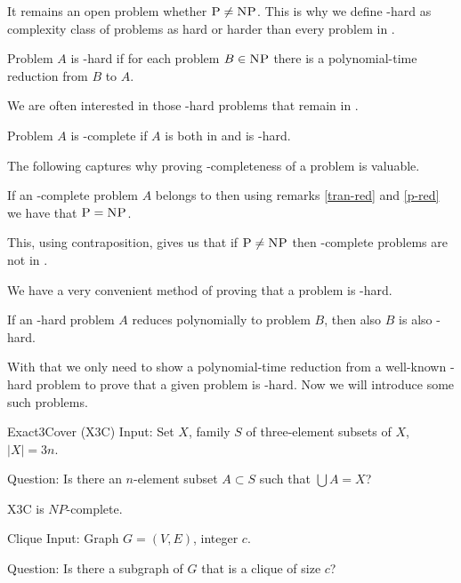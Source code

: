 It remains an open problem whether $\text{\textsc{P}}\neq\text{\textsc{NP}}$.
This is why we define \np-hard as complexity class of problems as hard or harder than every problem in \np.

\begin{defn}[\np-hard]
Problem $A$ is \np-hard if for each problem $B \in \text{\textsc{NP}}$
there is a polynomial-time reduction from $B$ to $A$.
\end{defn}

We are often interested in those \np-hard problems that remain in \np.

\begin{defn}[\np-complete]
Problem $A$ is \np-complete if $A$ is both in \np and is \np-hard.
\end{defn}

The following captures why proving \np-completeness of a problem is valuable.

\begin{rmrk}
If an \np-complete problem $A$ belongs to \p then using remarks \ref{tran-red} and \ref{p-red}
we have that $\text{\textsc{P}} = \text{\textsc{NP}}$.
\end{rmrk}

This, using contraposition, gives us that if $\text{\textsc{P}} \neq \text{\textsc{NP}}$ then \np-complete problems are not in \p.

We have a very convenient method of proving that a problem is \np-hard.

\begin{rmrk}
If an \np-hard problem $A$ reduces polynomially to problem $B$, then also $B$ is also \np-hard.
\end{rmrk}

With that we only need to show a polynomial-time reduction from a well-known \np-hard problem
to prove that a given problem is \np-hard.
Now we will introduce some such problems.

\begin{problem}{Exact3Cover (X3C)}
	Input: Set $X$, family $S$ of three-element subsets of $X$, $\vert{X}\vert = 3n$.

	Question: Is there an $n$-element subset $A \subset S$ such that $\bigcup A = X$?
\end{problem}

\begin{thm}
\textsc{X3C} is $NP$-complete.
\end{thm}


\begin{problem}{Clique}
    Input: Graph $G = (V, E)$, integer $c$.

    Question: Is there a subgraph of $G$ that is a clique of size $c$?
\end{problem}

